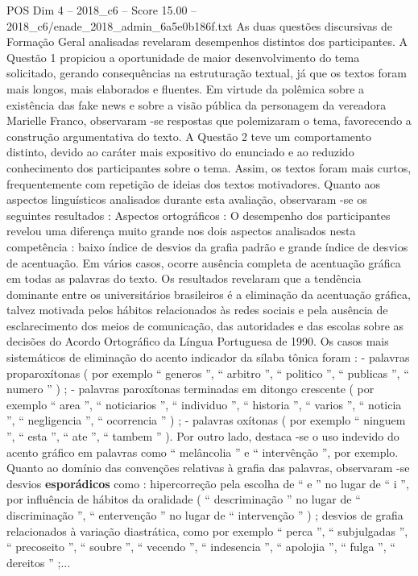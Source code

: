 \begin{textsample}{POS Dim 4 – 2018\_c6 – Score 15.00 – 2018\_c6/enade\_2018\_admin\_6a5e0b186f.txt}
As duas questões discursivas de Formação Geral analisadas revelaram desempenhos distintos dos participantes.
A Questão 1 propiciou a oportunidade de maior desenvolvimento do tema solicitado, gerando consequências na estruturação textual, já que os textos foram mais longos, mais elaborados e fluentes.
Em virtude da polêmica sobre a existência das fake news e sobre a visão pública da personagem da vereadora Marielle Franco, observaram -se respostas que polemizaram o tema, favorecendo a construção argumentativa do texto.
A Questão 2 teve um comportamento distinto, devido ao caráter mais expositivo do enunciado e ao reduzido conhecimento dos participantes sobre o tema.
Assim, os textos foram mais curtos, frequentemente com repetição de ideias dos textos motivadores.
Quanto aos aspectos linguísticos analisados durante esta avaliação, observaram -se os seguintes resultados : Aspectos ortográficos : O desempenho dos participantes revelou uma diferença muito grande nos dois aspectos analisados nesta competência : baixo índice de desvios da grafia padrão e grande índice de desvios de acentuação.
Em vários casos, ocorre ausência completa de acentuação gráfica em todas as palavras do texto.
Os resultados revelaram que a tendência dominante entre os universitários brasileiros é a eliminação da acentuação gráfica, talvez motivada pelos hábitos relacionados às redes sociais e pela ausência de esclarecimento dos meios de comunicação, das autoridades e das escolas sobre as decisões do Acordo Ortográfico da Língua Portuguesa de 1990.
Os casos mais sistemáticos de eliminação do acento indicador da sílaba tônica foram : - palavras proparoxítonas ( por exemplo “ generos ”, “ arbitro ”, “ politico ”, “ publicas ”, “ numero ” ) ; - palavras paroxítonas terminadas em ditongo crescente ( por exemplo “ area ”, “ noticiarios ”, “ individuo ”, “ historia ”, “ varios ”, “ noticia ”, “ negligencia ”, “ ocorrencia ” ) ; - palavras oxítonas ( por exemplo “ ninguem ”, “ esta ”, “ ate ”, “ tambem ” ).
Por outro lado, destaca -se o uso indevido do acento gráfico em palavras como “ melâncolia ” e “ intervênção ”, por exemplo.
Quanto ao domínio das convenções relativas à grafia das palavras, observaram -se desvios \textbf{esporádicos} como : hipercorreção pela escolha de “ e ” no lugar de “ i ”, por influência de hábitos da oralidade ( “ descriminação ” no lugar de “ discriminação ”, “ entervenção ” no lugar de “ intervenção ” ) ; desvios de grafia relacionados à variação diastrática, como por exemplo “ perca ”, “ subjulgadas ”, “ precoseito ”, “ soubre ”, “ vecendo ”, “ indesencia ”, “ apolojia ”, “ fulga ”, “ dereitos ” ;...

\end{textsample}
